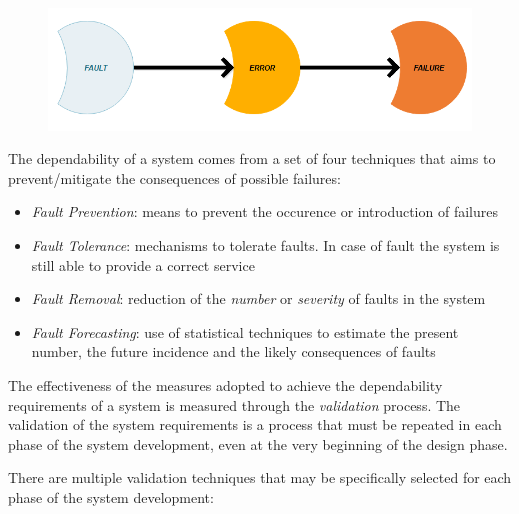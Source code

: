 \begin{figure}[h!]
	\includegraphics[width=\textwidth]{img/fault-error-failure.png}
	\caption{}
\end{figure}

The dependability of a system comes from a set of four techniques that aims to prevent/mitigate the consequences of possible failures:

\begin{itemize}
	\item \textsl{Fault Prevention}: means to prevent the occurence or introduction of failures
	\item \textsl{Fault Tolerance}: mechanisms to tolerate faults. In case of fault the system is still able to provide a correct service
	\item \textsl{Fault Removal}: reduction of the \textsl{number} or \textsl{severity} of faults in the system
	\item \textsl{Fault Forecasting}: use of statistical techniques to estimate the present number, the future incidence and the likely consequences of faults
\end{itemize}

The effectiveness of the measures adopted to achieve the dependability requirements of a system is measured through the \textsl{validation} process.
The validation of the system requirements is a process that must be repeated in each phase of the system development, even at the very beginning of the design phase.

There are multiple validation techniques that may be specifically selected for each phase of the system development: \cite{bonda}

